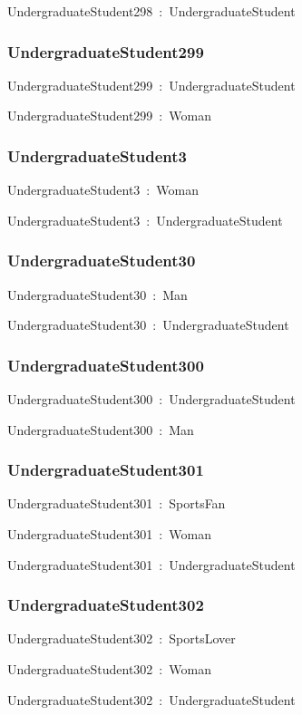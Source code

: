 \documentclass{article}
\begin{document}
UndergraduateStudent298~:~UndergraduateStudent

\subsubsection*{UndergraduateStudent299}

UndergraduateStudent299~:~UndergraduateStudent

UndergraduateStudent299~:~Woman

\subsubsection*{UndergraduateStudent3}

UndergraduateStudent3~:~Woman

UndergraduateStudent3~:~UndergraduateStudent

\subsubsection*{UndergraduateStudent30}

UndergraduateStudent30~:~Man

UndergraduateStudent30~:~UndergraduateStudent

\subsubsection*{UndergraduateStudent300}

UndergraduateStudent300~:~UndergraduateStudent

UndergraduateStudent300~:~Man

\subsubsection*{UndergraduateStudent301}

UndergraduateStudent301~:~SportsFan

UndergraduateStudent301~:~Woman

UndergraduateStudent301~:~UndergraduateStudent

\subsubsection*{UndergraduateStudent302}

UndergraduateStudent302~:~SportsLover

UndergraduateStudent302~:~Woman

UndergraduateStudent302~:~UndergraduateStudent
\end{document}
